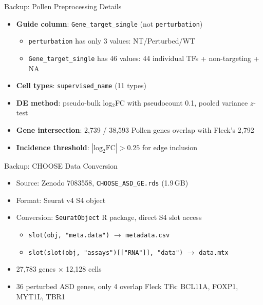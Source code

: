 \documentclass[aspectratio=169,11pt]{beamer}
\begin{document}
\begin{frame}{Backup: Pollen Preprocessing Details}

\begin{itemize}
    \item \textbf{Guide column}: \texttt{Gene\_target\_single} (not \texttt{perturbation})
    \begin{itemize}
        \item \texttt{perturbation} has only 3 values: NT/Perturbed/WT
        \item \texttt{Gene\_target\_single} has 46 values: 44 individual TFs + non-targeting + NA
    \end{itemize}
    \item \textbf{Cell types}: \texttt{supervised\_name} (11 types)
    \item \textbf{DE method}: pseudo-bulk log$_2$FC with pseudocount 0.1, pooled variance $z$-test
    \item \textbf{Gene intersection}: 2{,}739 / 38{,}593 Pollen genes overlap with Fleck's 2{,}792
    \item \textbf{Incidence threshold}: $|\text{log}_2\text{FC}| > 0.25$ for edge inclusion
\end{itemize}

\end{frame}

\begin{frame}{Backup: CHOOSE Data Conversion}

\begin{itemize}
    \item Source: Zenodo 7083558, \texttt{CHOOSE\_ASD\_GE.rds} (1.9\,GB)
    \item Format: Seurat v4 S4 object
    \item Conversion: \texttt{SeuratObject} R package, direct S4 slot access
    \begin{itemize}
        \item \texttt{slot(obj, "meta.data")} $\rightarrow$ \texttt{metadata.csv}
        \item \texttt{slot(slot(obj, "assays")[["RNA"]], "data")} $\rightarrow$ \texttt{data.mtx}
    \end{itemize}
    \item 27{,}783 genes $\times$ 12{,}128 cells
    \item 36 perturbed ASD genes, only 4 overlap Fleck TFs: BCL11A, FOXP1, MYT1L, TBR1
\end{itemize}

\end{frame}
\end{document}
